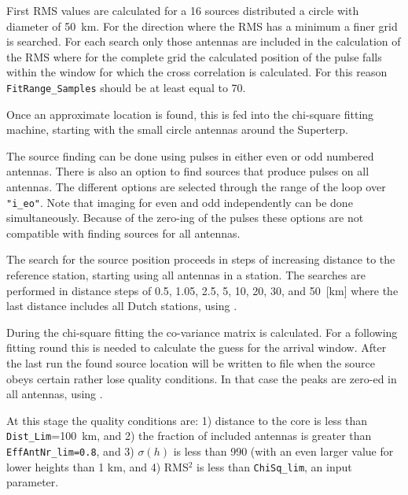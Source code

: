 First RMS values are calculated for a 16 sources distributed a circle with diameter of 50~km. For the direction where the RMS has a minimum a finer grid is searched. For each search only those antennas are included in the calculation of the RMS where for the complete grid the calculated position of the pulse falls within the window for which the cross correlation is calculated. For this reason \verb!FitRange_Samples! should be at least equal to 70.

Once an approximate location is found, this is fed into the chi-square fitting machine, starting with the small circle antennas around the Superterp.


The source finding can be done using pulses in either even or odd numbered antennas. There is also an option to find sources that produce pulses on all antennas. The different options are selected through the range of the loop over \verb!"i_eo"!. Note that imaging for even and odd independently can be done simultaneously. Because of the zero-ing of the pulses these options are not compatible with finding sources for all antennas.

The search for the source position proceeds in steps of increasing distance to the reference station, starting using all antennas in a station. The searches are performed in distance steps of 0.5, 1.05, 2.5, 5, 10, 20, 30, and 50~[km] where the last distance includes all Dutch stations, using .

During the chi-square fitting the co-variance matrix is calculated. For a following fitting round this is needed to calculate the guess for the arrival window. After the last run the found source location will be written to file when the source obeys certain rather lose quality conditions. In that case the peaks are zero-ed in all antennas, using .

At this stage the quality conditions are:
1) distance to the core is less than \verb!Dist_Lim!=100~km, and
2) the fraction of included antennas is greater than \verb!EffAntNr_lim=0.8!, and
3) $\sigma(h)$ is less than 990 (with an even larger value for lower heights than 1 km, and
4) RMS$^2$ is less than \verb!ChiSq_lim!, an input parameter.


